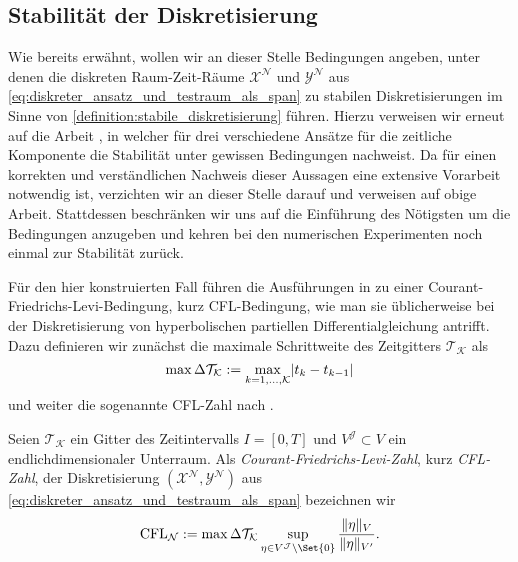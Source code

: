 \documentclass[../main.tex]{subfiles}
\begin{document}
\subsection*{Stabilität der Diskretisierung} %

Wie bereits erwähnt, wollen wir an dieser Stelle Bedingungen angeben, unter denen die diskreten Raum-Zeit-Räume $\mathcal X^{\mathcal N}$ und $\mathcal Y^{\mathcal N}$ aus \cref{eq:diskreter_ansatz_und_testraum_als_span} zu stabilen Diskretisierungen im Sinne von \cref{definition:stabile_diskretisierung} führen.
Hierzu verweisen wir erneut auf die Arbeit \cite[Section 5.2]{Andreev:2012ep}, in welcher \citeauthor{Andreev:2012ep} für drei verschiedene Ansätze für die zeitliche Komponente die Stabilität unter gewissen Bedingungen nachweist.
Da für einen korrekten und verständlichen Nachweis dieser Aussagen eine extensive Vorarbeit notwendig ist, verzichten wir an dieser Stelle darauf und verweisen auf obige Arbeit.
Stattdessen beschränken wir uns auf die Einführung des Nötigsten um die Bedingungen anzugeben und kehren bei den numerischen Experimenten noch einmal zur Stabilität zurück.

Für den hier konstruierten Fall führen die Ausführungen in \cite{Andreev:2012ep} zu einer Courant-Friedrichs-Levi-Bedingung, kurz CFL-Bedingung, wie man sie üblicherweise bei der Diskretisierung von hyperbolischen partiellen Differentialgleichung antrifft.
Dazu definieren wir zunächst die maximale Schrittweite des Zeitgitters $\mathcal T_{\mathcal K}$ als
\begin{equation}
    \label{eq:maximale_zeitschrittweite}
    \max \Delta \mathcal T_{\mathcal K} := \max_{k = 1, \dots, \mathcal K} \lvert t_{k} - t_{k - 1}\rvert
\end{equation}
und weiter die sogenannte CFL-Zahl nach \cite[62]{Andreev:2012ep}.

\begin{Definition}
    Seien $\mathcal T_{\mathcal K}$ ein Gitter des Zeitintervalls $I = [0, T]$ und $V^{\mathcal J} \subset V$ ein endlichdimensionaler Unterraum.
    Als \emph{Courant-Friedrichs-Levi-Zahl}, kurz \emph{CFL-Zahl}, der Diskretisierung $(\mathcal X^{\mathcal N}, \mathcal Y^{\mathcal N})$ aus \cref{eq:diskreter_ansatz_und_testraum_als_span} bezeichnen wir
    \begin{equation}
        \label{eq:cfl_zahl}
        \mathrm{CFL}_{\mathcal N} := \max \Delta \mathcal T_{\mathcal K} \sup_{\eta \in V^{\mathcal J} \setminus \Set{0} } \frac{\norm{\eta}_{V}}{\norm{\eta}_{V'}}.
    \end{equation}
\end{Definition}
\end{document}

